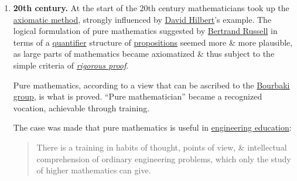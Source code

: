 \documentclass{article}
\begin{document}
\begin{enumerate}
	\item {\bf20th century.} At the start of the 20th century mathematicians took up the \href{https://en.wikipedia.org/wiki/Axiomatic_method}{axiomatic method}, strongly influenced by \href{https://en.wikipedia.org/wiki/David_Hilbert}{\sc David Hilbert}'s example. The logical formulation of pure mathematics suggested by \href{https://en.wikipedia.org/wiki/Bertrand_Russell}{\sc Bertrand Russell} in terms of a \href{https://en.wikipedia.org/wiki/Quantifier_(logic)}{quantifier} structure of \href{https://en.wikipedia.org/wiki/Proposition_(mathematics)}{propositions} seemed more \& more plausible, as large parts of mathematics became axiomatized \& thus subject to the simple criteria of \href{https://en.wikipedia.org/wiki/Rigorous_proof}{\it rigorous proof}.
	
	Pure mathematics, according to a view that can be ascribed to the \href{https://en.wikipedia.org/wiki/Bourbaki_group}{Bourbaki group}, is what is proved. ``Pure mathematician'' became a recognized vocation, achievable through training.
	
	The case was made that pure mathematics is useful in \href{https://en.wikipedia.org/wiki/Engineering_education}{engineering education}:
	\begin{quote}
		There is a training in habits of thought, points of view, \& intellectual comprehension of ordinary engineering problems, which only the study of higher mathematics can give.
	\end{quote}
\end{enumerate}
\end{document}
